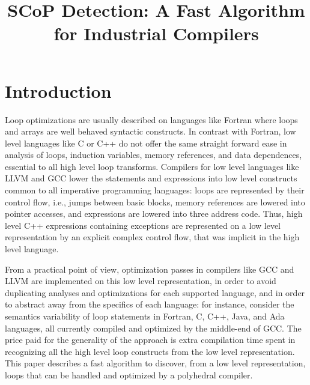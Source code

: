 \documentclass{sigplanconf}
\begin{document}
\setlength{\pdfpageheight}{\paperheight}
\setlength{\pdfpagewidth}{\paperwidth}


\title{SCoP Detection: A Fast Algorithm for Industrial Compilers}

\maketitle

\begin{abstract}
\end{abstract}

\section{Introduction}

Loop optimizations are usually described on languages like Fortran where loops
and arrays are well behaved syntactic constructs.  In contrast with Fortran, low
level languages like C or C++ do not offer the same straight forward ease in
analysis of loops, induction variables, memory references, and data dependences,
essential to all high level loop transforms.  Compilers for low level languages
like LLVM and GCC lower the statements and expressions into low level constructs
common to all imperative programming languages: loops are represented by their
control flow, i.e., jumps between basic blocks, memory references are lowered
into pointer accesses, and expressions are lowered into three address code.
Thus, high level C++ expressions containing exceptions are represented on a low
level representation by an explicit complex control flow, that was implicit in
the high level language.

From a practical point of view, optimization passes in compilers like GCC and
LLVM are implemented on this low level representation, in order to avoid
duplicating analyses and optimizations for each supported language, and in order
to abstract away from the specifics of each language: for instance, consider the
semantics variability of loop statements in Fortran, C, C++, Java, and Ada
languages, all currently compiled and optimized by the middle-end of GCC.  The
price paid for the generality of the approach is extra compilation time spent in
recognizing all the high level loop constructs from the low level
representation.  This paper describes a fast algorithm to discover, from a low
level representation, loops that can be handled and optimized by a polyhedral
compiler.
\end{document}
